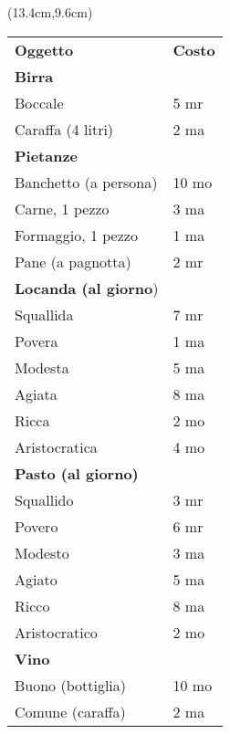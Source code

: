 \documentclass[a4paper,12 pt,openany]{book}
\begin{document}
\begin{textblock*}{6cm}(13.4cm,9.6cm) %

\begin{tabular}{ll}
\textbf{Oggetto}&\textbf{Costo}\\
\textbf{Birra}&\\
Boccale&5 mr\\
Caraffa (4 litri)&2 ma\\
\textbf{Pietanze} &\\
Banchetto (a persona)&10 mo\\
Carne, 1 pezzo&3 ma\\
Formaggio, 1 pezzo&1 ma\\
Pane (a pagnotta)&2 mr\\
\textbf{Locanda (al giorno})&\\
Squallida&7 mr\\
Povera&1 ma\\
Modesta&5 ma\\
Agiata&8 ma\\
Ricca&2 mo\\
Aristocratica&4 mo\\
\textbf{Pasto (al giorno)}&\\
Squallido&3 mr\\
Povero&6 mr\\
Modesto&3 ma\\
Agiato&5 ma\\
Ricco&8 ma\\
Aristocratico&2 mo\\
\textbf{Vino}&\\
Buono (bottiglia)&10 mo\\
Comune (caraffa)&2 ma\\
\end{tabular}





\end{textblock*}


~\newpage
\end{document}

